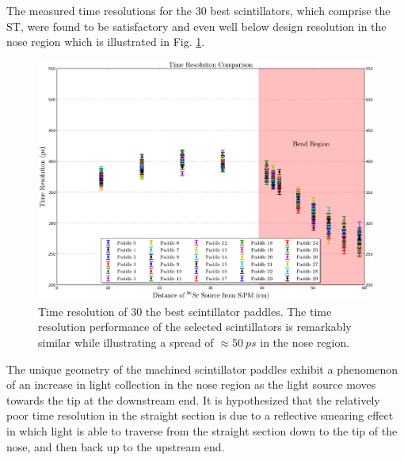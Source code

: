 The measured time resolutions for the 30 best scintillators, which comprise the ST, were found to be satisfactory and even well below design resolution in the nose region which is illustrated in Fig. \ref{fig:time_res_comp_final_30}.
	\begin{figure}[!htb]
		\centering
		\includegraphics[width=1.0\columnwidth]{fabrication/figs/time_res_comp_final_30}
		\caption{Time resolution of 30 the best scintillator paddles.  The time resolution performance of the selected scintillators is remarkably similar while illustrating a spread of $\approx 50\ ps$ in the nose region.}
		\label{fig:time_res_comp_final_30}
	\end{figure}

The unique geometry of the machined scintillator paddles exhibit a phenomenon of an increase in light collection in the nose region as the light source moves towards the tip at the downstream end.  It is hypothesized that the relatively poor time resolution in the straight section is due to a reflective smearing effect in which light is able to traverse from the straight section down to the tip of the nose, and then back up to the upstream end.

